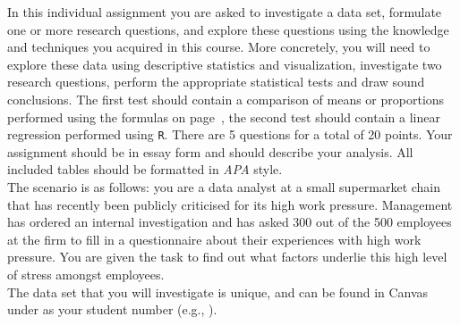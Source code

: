 {\footnotesize

In this individual assignment you are asked to investigate a data set, formulate one or more research questions, and explore these questions using the knowledge and techniques you acquired in this course. More concretely, you will need to explore these data using descriptive statistics and visualization, investigate two research questions, perform the appropriate statistical tests and draw sound conclusions. The first test should contain a comparison of means or proportions performed using the formulas on page~\pageref{formulasheet}, the second test should contain a linear regression performed using \texttt{R}. There are 5 questions for a total of 20 points. Your assignment should be in essay form and should describe your analysis. All included tables should be formatted in \textit{APA} style. \\

The scenario is as follows: you are a data analyst at a small supermarket chain that has recently been publicly criticised for its high work pressure. Management has ordered an internal investigation and has asked 300 out of the 500 employees at the firm to fill in a questionnaire about their experiences with high work pressure. You are given the task to find out what factors underlie this high level of stress amongst employees. \\

The data set that you will investigate is unique, and can be found in Canvas under as your student number (e.g., ). \\

}
